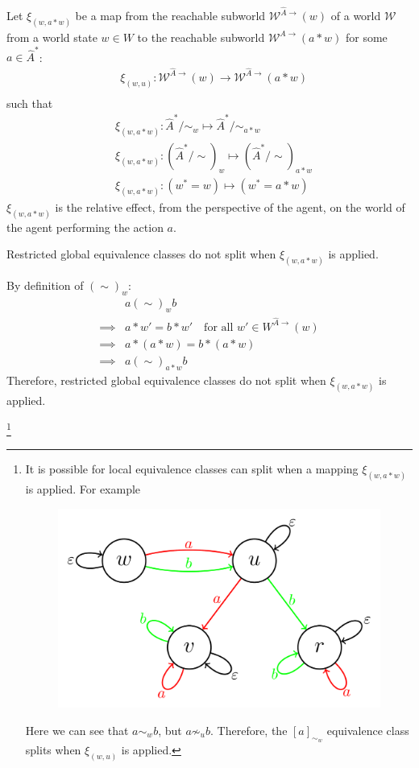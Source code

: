 Let $\xi_{(w, a \ast w)}$ be a map from the reachable subworld $\mathscr{W}^{\hat{A}\to}(w)$ of a world $\mathscr{W}$ from a world state $w \in W$ to the reachable subworld $\mathscr{W}^{\hat{A}\to}(a \ast w)$ for some $a \in \hat{A}^{*}$:
\begin{align}
    & \xi_{(w, u)}: \mathscr{W}^{\hat{A}\to}(w) \to \mathscr{W}^{\hat{A}\to}(a \ast w) \\
\end{align}
such that
\begin{align}
    & \xi_{(w, a \ast w)}: \hat{A}^{*}/\sim_{w} \mapsto \hat{A}^{*}/\sim_{a \ast w} \\
    & \xi_{(w, a \ast w)}: (\hat{A}^{*}/\sim)_{w} \mapsto (\hat{A}^{*}/\sim)_{a \ast w} \\
    & \xi_{(w, a \ast w)}: (w^{*}=w) \mapsto (w^{*}=a \ast w)
\end{align}
$\xi_{(w, a \ast w)}$ is the relative effect, from the perspective of the agent, on the world of the agent performing the action $a$.

\begin{propositionE}
    Restricted global equivalence classes do not split when $\xi_{(w, a \ast w)}$ is applied.
\end{propositionE}
\begin{proofE}
    By definition of $(\sim)_{w}$:
    \begin{align}
        & a (\sim)_{w} b \\
        \implies & a \ast w' = b \ast w' \quad \text{for all $w' \in W^{\hat{A}\to}(w)$} \\
        \implies & a \ast (a \ast w) = b \ast (a \ast w) \\
        \implies & a (\sim)_{a \ast w} b
    \end{align}
    Therefore, restricted global equivalence classes do not split when $\xi_{(w, a \ast w)}$ is applied. 
\end{proofE}

\footnote{
It is possible for local equivalence classes can split when a mapping $\xi_{(w, a \ast w)}$ is applied.
For example
\begin{figure}[H]
    \includegraphics[width=0.5\linewidth]{6BeyondSBDRLLocalAlgebras/Images/local_equiv_classes_can_split_when_action_performed.png}
    \caption{
    }
\end{figure}
Here we can see that $a \sim_{w} b$, but $a \not\sim_{u} b$.
Therefore, the $[a]_{\sim_{w}}$ equivalence class splits when $\xi_{(w, u)}$ is applied.
}



